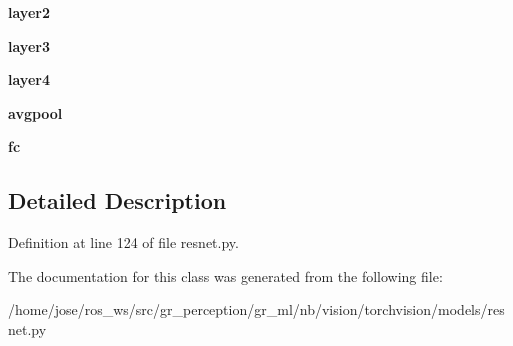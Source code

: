 \begin{DoxyCompactItemize}
\mbox{\label{classtorchvision_1_1models_1_1resnet_1_1ResNet_a43de1c993585bb39a773e4c4232ef799}} 
{\bfseries layer2}
\item 
\mbox{\label{classtorchvision_1_1models_1_1resnet_1_1ResNet_a9fbb95809272540fa4c8411cb959d2d8}} 
{\bfseries layer3}
\item 
\mbox{\label{classtorchvision_1_1models_1_1resnet_1_1ResNet_a33c978dddea6541b8cde2f4d6038d04e}} 
{\bfseries layer4}
\item 
\mbox{\label{classtorchvision_1_1models_1_1resnet_1_1ResNet_a94788be575ddecd349031709e76084e1}} 
{\bfseries avgpool}
\item 
\mbox{\label{classtorchvision_1_1models_1_1resnet_1_1ResNet_abdf96830416bdf93b8a2d09d956e7b53}} 
{\bfseries fc}
\end{DoxyCompactItemize}


\subsection{Detailed Description}


Definition at line 124 of file resnet.\+py.



The documentation for this class was generated from the following file\+:\begin{DoxyCompactItemize}
\item 
/home/jose/ros\+\_\+ws/src/gr\+\_\+perception/gr\+\_\+ml/nb/vision/torchvision/models/resnet.\+py\end{DoxyCompactItemize}
